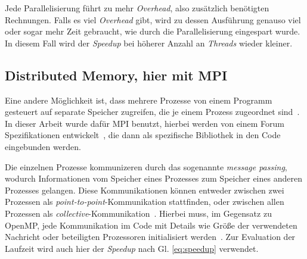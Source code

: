 	Jede Parallelisierung führt zu mehr \textit{Overhead}, also zusätzlich benötigten Rechnungen. Falls es viel \textit{Overhead} gibt, wird zu dessen Ausführung genauso viel oder sogar mehr Zeit gebraucht, wie durch die Parallelisierung eingespart wurde. In diesem Fall wird der \textit{Speedup} bei höherer Anzahl an \textit{Threads} wieder kleiner.
	\subsection{Distributed Memory, hier mit MPI}
	\label{subsecmpitheorie}
	Eine andere Möglichkeit ist, dass mehrere Prozesse von einem Programm gesteuert auf separate Speicher zugreifen, die je einem Prozess zugeordnet sind~\cite[vgl. ][S. 83]{pachecoparallel}. In dieser Arbeit wurde dafür MPI benutzt, hierbei werden von einem Forum Spezifikationen entwickelt~\cite{mpiforum}, die dann als spezifische Bibliothek in den Code eingebunden werden.
	
	Die einzelnen Prozesse kommunizeren durch das sogenannte \textit{message passing}, wodurch Informationen vom Speicher eines Prozesses zum Speicher eines anderen Prozesses gelangen. Diese Kommunikationen können entweder zwischen zwei Prozessen als \textit{point-to-point}-Kommunikation stattfinden, oder zwischen allen Prozessen als \textit{collective}-Kommunikation~\cite[vgl. ][S. 83, S. 103f.]{pachecoparallel}. Hierbei muss, im Gegensatz zu OpenMP, jede Kommunikation im Code mit Details wie Größe der verwendeten Nachricht oder beteiligten Prozessoren initialisiert werden~\cite[vgl. ][S. 88ff.]{pachecoparallel}. Zur Evaluation der Laufzeit wird auch hier der \textit{Speedup} nach Gl. \ref{eq:speedup} verwendet.


